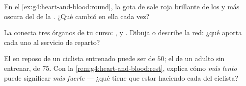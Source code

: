 \begin{exercise}[$\star\star$]\label{exo:g4:heart-and-blood:9}
En el \cref{ex:g4:heart-and-blood:round}, la gota de  sale roja
brillante de los  y más oscura del  de la . ¿Qué
cambió en ella cada vez?
\end{exercise}

\begin{exercise}[$\star\star$]\label{exo:g4:heart-and-blood:10}
La  conecta tres órganos de tu curso: ,
 y . Dibuja o describe la red: ¿qué aporta cada uno al
servicio de reparto?
\end{exercise}

\begin{exercise}[$\star\star\star$]\label{exo:g4:heart-and-blood:11}
El  en reposo de un ciclista entrenado puede ser de $50$; el de
un adulto sin entrenar, de $75$. Con la
\cref{rem:g4:heart-and-blood:rest}, explica cómo \emph{más lento}
puede significar \emph{más fuerte} --- ¿qué tiene que estar haciendo
cada  del ciclista?
\end{exercise}
